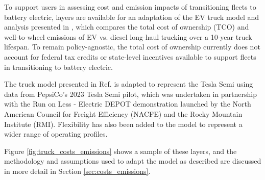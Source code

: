 To support users in assessing cost and emission impacts of transitioning fleets to battery electric, layers are available for an adaptation of the EV truck model and analysis presented in \cite{Sader_2023}, which compares the total cost of ownership (TCO) and well-to-wheel emissions of EV vs. diesel long-haul trucking over a 10-year truck lifespan. To remain policy-agnostic, the total cost of ownership currently does not account for federal tax credits or state-level incentives available to support fleets in transitioning to battery electric.

The truck model presented in Ref. \cite{Sader_2023} is adapted to represent the Tesla Semi using data from PepsiCo's 2023 Tesla Semi pilot, which was undertaken in partnership with the Run on Less - Electric DEPOT demonstration \cite{NACFE_2023} launched by the North American Council for Freight Efficiency (NACFE) and the Rocky Mountain Institute (RMI). Flexibility has also been added to the model to represent a wider range of operating profiles. 

Figure \ref{fig:truck_costs_emissions} shows a sample of these layers, and the methodology and assumptions used to adapt the model as described are discussed in more detail in Section \ref{sec:costs_emissions}.

